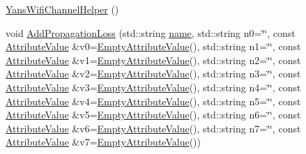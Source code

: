 \begin{DoxyCompactItemize}
\item 
\hyperlink{classns3_1_1YansWifiChannelHelper_abc7aa0f2cec4deabe34aa7d3ec074b87}{Yans\+Wifi\+Channel\+Helper} ()
\item 
void \hyperlink{classns3_1_1YansWifiChannelHelper_a71c64d54e148b43698c65736e1c77156}{Add\+Propagation\+Loss} (std\+::string \hyperlink{generate__test__data__lte__spectrum__model_8m_ab74e6bf80237ddc4109968cedc58c151}{name}, std\+::string n0=\char`\"{}\char`\"{}, const \hyperlink{classns3_1_1AttributeValue}{Attribute\+Value} \&v0=\hyperlink{classns3_1_1EmptyAttributeValue}{Empty\+Attribute\+Value}(), std\+::string n1=\char`\"{}\char`\"{}, const \hyperlink{classns3_1_1AttributeValue}{Attribute\+Value} \&v1=\hyperlink{classns3_1_1EmptyAttributeValue}{Empty\+Attribute\+Value}(), std\+::string n2=\char`\"{}\char`\"{}, const \hyperlink{classns3_1_1AttributeValue}{Attribute\+Value} \&v2=\hyperlink{classns3_1_1EmptyAttributeValue}{Empty\+Attribute\+Value}(), std\+::string n3=\char`\"{}\char`\"{}, const \hyperlink{classns3_1_1AttributeValue}{Attribute\+Value} \&v3=\hyperlink{classns3_1_1EmptyAttributeValue}{Empty\+Attribute\+Value}(), std\+::string n4=\char`\"{}\char`\"{}, const \hyperlink{classns3_1_1AttributeValue}{Attribute\+Value} \&v4=\hyperlink{classns3_1_1EmptyAttributeValue}{Empty\+Attribute\+Value}(), std\+::string n5=\char`\"{}\char`\"{}, const \hyperlink{classns3_1_1AttributeValue}{Attribute\+Value} \&v5=\hyperlink{classns3_1_1EmptyAttributeValue}{Empty\+Attribute\+Value}(), std\+::string n6=\char`\"{}\char`\"{}, const \hyperlink{classns3_1_1AttributeValue}{Attribute\+Value} \&v6=\hyperlink{classns3_1_1EmptyAttributeValue}{Empty\+Attribute\+Value}(), std\+::string n7=\char`\"{}\char`\"{}, const \hyperlink{classns3_1_1AttributeValue}{Attribute\+Value} \&v7=\hyperlink{classns3_1_1EmptyAttributeValue}{Empty\+Attribute\+Value}())
\item 

\end{DoxyCompactItemize}
